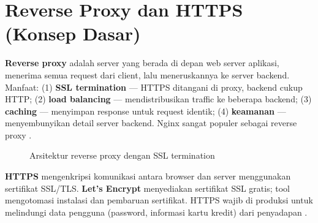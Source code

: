 ﻿\section{Reverse Proxy dan HTTPS (Konsep Dasar)}

\textbf{Reverse proxy} adalah server yang berada di depan web server aplikasi, menerima semua request dari client, lalu meneruskannya ke server backend. Manfaat: (1) \textbf{SSL termination} --- HTTPS ditangani di proxy, backend cukup HTTP; (2) \textbf{load balancing} --- mendistribusikan traffic ke beberapa backend; (3) \textbf{caching} --- menyimpan response untuk request identik; (4) \textbf{keamanan} --- menyembunyikan detail server backend. Nginx sangat populer sebagai reverse proxy \cite{mdnDeploy}.

\begin{figure}[H]
\centering
{}
\caption{Arsitektur reverse proxy dengan SSL termination}
\end{figure}

\textbf{HTTPS} mengenkripsi komunikasi antara browser dan server menggunakan sertifikat SSL/TLS. \textbf{Let's Encrypt} menyediakan sertifikat SSL gratis; tool  mengotomasi instalasi dan pembaruan sertifikat. HTTPS wajib di produksi untuk melindungi data pengguna (password, informasi kartu kredit) dari penyadapan \cite{mdnDeploy}.

